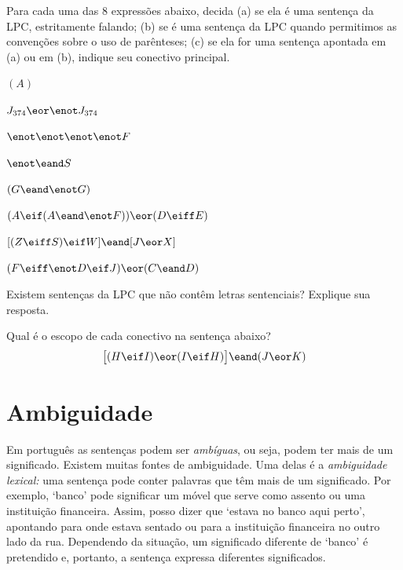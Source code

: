 \solutions
\problempart
\label{pr.wiffTFL}
Para cada uma das $8$ expressões abaixo, decida (a) se ela é uma sentença da LPC, estritamente falando; (b) se é uma sentença da LPC quando permitimos as convenções sobre o uso de parênteses; (c) se ela for uma sentença apontada em (a) ou em (b), indique seu conectivo principal.
\begin{earg}
\item $(A)$
\item $J_{374} \eor \enot J_{374}$
\item $\enot \enot \enot \enot F$
\item $\enot \eand S$
\item $(G \eand \enot G)$
\item $(A \eif (A \eand \enot F)) \eor (D \eiff E)$
\item $[(Z \eiff S) \eif W] \eand [J \eor X]$
\item $(F \eiff \enot D \eif J) \eor (C \eand D)$
\end{earg}

\problempart
Existem sentenças da LPC que não contêm letras sentenciais? Explique sua resposta.

\problempart
Qual é o escopo de cada conectivo na sentença abaixo?
$$\bigl[(H \eif I) \eor (I \eif H)\bigr] \eand (J \eor K)$$

\chapter{Ambiguidade}\label{s:AbmbiguityTFL}

Em português as sentenças podem ser \textit{ambíguas}, ou seja, podem ter mais de um significado. Existem muitas fontes de ambiguidade. Uma delas é a \emph{ambiguidade lexical:} uma sentença pode conter palavras que têm mais de um significado. Por exemplo, `banco' pode significar um móvel que serve como assento ou uma instituição financeira. Assim, posso dizer que `estava no banco aqui perto', apontando para onde estava sentado ou para a instituição financeira no outro lado da rua. Dependendo da situação, um significado diferente de `banco' é pretendido e, portanto, a sentença expressa diferentes significados.

